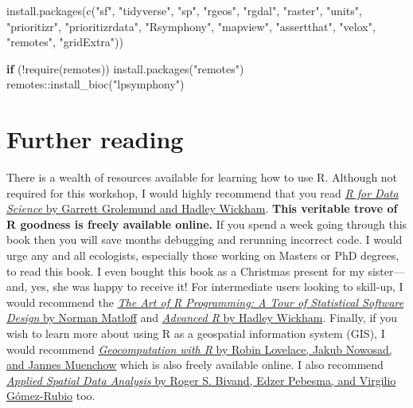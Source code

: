 \documentclass[
  12pt,
]{book}
\newenvironment{Shaded}{\begin{snugshade}}{\end{snugshade}}
\newcommand{\ControlFlowTok}[1]{\textcolor[rgb]{0.13,0.29,0.53}{\textbf{#1}}}
\newcommand{\FunctionTok}[1]{\textcolor[rgb]{0.00,0.00,0.00}{#1}}
\newcommand{\NormalTok}[1]{#1}
\newcommand{\SpecialCharTok}[1]{\textcolor[rgb]{0.00,0.00,0.00}{#1}}
\newcommand{\StringTok}[1]{\textcolor[rgb]{0.31,0.60,0.02}{#1}}
\begin{document}
\begin{Shaded}
\begin{Highlighting}[]
\FunctionTok{install.packages}\NormalTok{(}\FunctionTok{c}\NormalTok{(}\StringTok{"sf"}\NormalTok{, }\StringTok{"tidyverse"}\NormalTok{, }\StringTok{"sp"}\NormalTok{, }\StringTok{"rgeos"}\NormalTok{, }\StringTok{"rgdal"}\NormalTok{, }\StringTok{"raster"}\NormalTok{,}
                   \StringTok{"units"}\NormalTok{, }\StringTok{"prioritizr"}\NormalTok{, }\StringTok{"prioritizrdata"}\NormalTok{, }\StringTok{"Rsymphony"}\NormalTok{,}
                   \StringTok{"mapview"}\NormalTok{, }\StringTok{"assertthat"}\NormalTok{, }\StringTok{"velox"}\NormalTok{, }\StringTok{"remotes"}\NormalTok{,}
                   \StringTok{"gridExtra"}\NormalTok{))}

\ControlFlowTok{if}\NormalTok{ (}\SpecialCharTok{!}\FunctionTok{require}\NormalTok{(remotes)) }\FunctionTok{install.packages}\NormalTok{(}\StringTok{"remotes"}\NormalTok{)}
\NormalTok{remotes}\SpecialCharTok{::}\FunctionTok{install\_bioc}\NormalTok{(}\StringTok{"lpsymphony"}\NormalTok{)}
\end{Highlighting}
\end{Shaded}

\hypertarget{further-reading}{%
\section{Further reading}\label{further-reading}}

There is a wealth of resources available for learning how to use R. Although not required for this workshop, I would highly recommend that you read \href{https://r4ds.had.co.nz/}{\emph{R for Data Science} by Garrett Grolemund and Hadley Wickham}. \textbf{This veritable trove of R goodness is freely available online.} If you spend a week going through this book then you will save months debugging and rerunning incorrect code. I would urge any and all ecologists, especially those working on Masters or PhD degrees, to read this book. I even bought this book as a Christmas present for my sister---and, yes, she was happy to receive it! For intermediate users looking to skill-up, I would recommend the \href{http://shop.oreilly.com/product/9781593273842.do}{\emph{The Art of R Programming: A Tour of Statistical Software Design} by Norman Matloff} and \href{https://adv-r.hadley.nz/}{\emph{Advanced R} by Hadley Wickham}. Finally, if you wish to learn more about using R as a geospatial information system (GIS), I would recommend \href{https://geocompr.robinlovelace.net/}{\emph{Geocomputation with R} by Robin Lovelace, Jakub Nowosad, and Jannes Muenchow} which is also freely available online. I also recommend \href{https://www.springer.com/gp/book/9781461476177}{\emph{Applied Spatial Data Analysis} by Roger S. Bivand, Edzer Pebesma, and Virgilio Gómez-Rubio} too.
\end{document}
